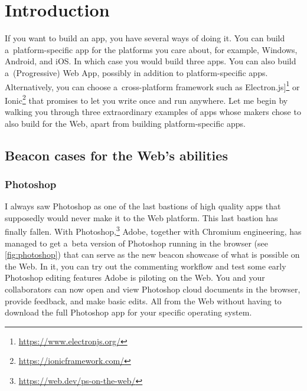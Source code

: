 \documentclass[sigconf]{acmart}
\begin{document}

\maketitle

\section{Introduction}

If you want to build an app, you have several ways of doing it. You can build a~platform-specific app for the platforms you care about, for example, Windows, Android, and iOS. In which case you would build three apps. You can also build a~(Progressive) Web App, possibly in addition to platform-specific apps. Alternatively, you can choose a~cross-platform framework such as Electron.js]\footnote{\url{https://www.electronjs.org/}} or Ionic\footnote{\url{https://ionicframework.com/}} that promises to let you write once and run anywhere. Let me begin by walking you through three extraordinary examples of apps whose makers chose to also build for the Web, apart from building platform-specific apps.

\subsection{Beacon cases for the Web's abilities}

\subsubsection{Photoshop}

I always saw Photoshop as one of the last bastions of high quality apps that supposedly would never make it to the Web platform. This last bastion has finally fallen. With Photoshop,\footnote{\url{https://web.dev/ps-on-the-web/}} Adobe, together with Chromium engineering, has managed to get a~beta version of Photoshop running in the browser (see \autoref{fig:photoshop}) that can serve as the new beacon showcase of what is possible on the Web. In it, you can try out the commenting workflow and test some early Photoshop editing features Adobe is piloting on the Web. You and your collaborators can now open and view Photoshop cloud documents in the browser, provide feedback, and make basic edits. All from the Web without having to download the full Photoshop app for your specific operating system.
\end{document}
